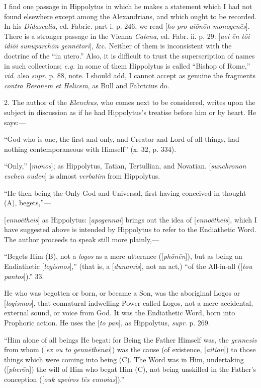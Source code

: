 I find one passage in Hippolytus in which he makes a statement
which I had not found elsewhere except among the Alexandrians, and
which ought to be recorded. In his \emph{Didascalia}, ed. Fabric. part
i. p. 246, we read [\emph{ho pro ai\={o}n\={o}n monogen\={e}s}].
There is a stronger passage in the Vienna \emph{Catena}, ed. Fabr. ii.
p. 29: [\emph{aei \={e}n t\={o}i idi\={o}i sunuparch\={o}n
genn\={e}tori}], \&c. Neither of them is inconsistent with
the doctrine of the ``in utero.'' Also, it is difficult to
trust the superscription of names in such collections; \emph{e.g.}
in some of them Hippolytus is called ``Bishop of Rome,'' \emph{vid}.
also \emph{supr}. p. 88, note. I should add, I cannot accept as
genuine the fragments \emph{contra Beronem et Helicem}, as Bull and
Fabricius do.

2. The author of the \emph{Elenchus}, who comes next to be
considered, writes upon the subject in discussion as if he had
Hippolytus's treatise before him or by heart. He says:—

``God who is one, the first and only, and Creator and Lord of
all things, had nothing contemporaneous with Himself'' (x. 32, p.
334).

``Only,'' [\emph{monos}]; as Hippolytus, Tatian, Tertullian,
and Novatian. [\emph{sunchronon eschen ouden}] is almost \emph{verbatim}
from Hippolytus.

``He then being the Only God and Universal, first having
conceived in thought (A), begets,''—

[\emph{enno\={e}theis}] as Hippolytus: [\emph{apogennai}] brings
out the idea of [\emph{enno\={e}theis}], which I have suggested
above is intended by Hippolytus to refer to the Endiathetic Word. The
author proceeds to speak still more plainly,—

``Begets Him (B), not a \emph{logos} as a mere utterance ([\emph{ph\={o}n\={e}n}]),
but as being an Endiathetic [\emph{logismos}],'' (that is, a [\emph{dunamis}],
not an act,) ``of the All-in-all ([\emph{tou pantos}]).'' 33.

He who was begotten or born, or became a Son, was the aboriginal
Logos or [\emph{logismos}], that connatural indwelling Power called
Logos, not a mere accidental, external sound, or voice from God. It
was the Endiathetic Word, born into Prophoric action. He uses the [\emph{to
pan}], as Hippolytus, \emph{supr}. p. 269.

``Him alone of all beings He begat: for Being the Father
Himself was, the \emph{gennesis} from whom ([\emph{ex ou to genn\={e}th\={e}nai}])
was the cause (of existence, [\emph{aition}]) to those things which
were coming into being (C). The Word was in Him, undertaking ([\emph{pher\={o}n}])
the will of Him who begat Him (C), not being unskilled in the Father's
conception ([\emph{ouk apeiros t\={e}s ennoias}]).''

